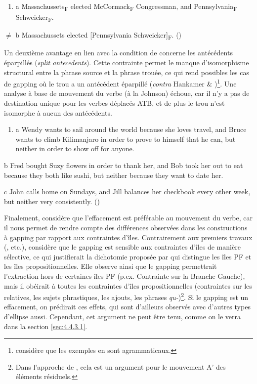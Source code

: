 \begin{enumerate}
\item \label{bkm:Ref288561460}a   Massachussets\textsubscript{F} elected McCormack\textsubscript{F} Congressman, and Pennsylvania\textsubscript{F} Schweicker\textsubscript{F}.  


\end{enumerate}
${\neq}$  b  Massachussets elected [Pennsylvania Schweicker]\textsubscript{F}.       (\citet{Hankamer1973})

Un deuxième avantage en lien avec la condition de \citet{Merchant2001} concerne les antécédents éparpillés (\textit{split antecedents}). Cette contrainte permet le manque d'isomorphisme structural entre la phrase source et la phrase trouée, ce qui rend possibles les cas de gapping où le trou a un antécédent éparpillé (\textit{contra} Hankamer \& \citet{Sag1976})\footnote{\citet[304]{Johnson2009} considère que les exemples en  sont agrammaticaux.}. Une analyse à base de mouvement du verbe (à la Johnson) échoue, car il n'y a pas de destination unique pour les verbes déplacés ATB, et de plus le trou n'est isomorphe à aucun des antécédents.


\begin{enumerate}
\item \label{bkm:Ref288640715}a   Wendy wants to sail around the world because she loves travel, and Bruce wants to climb Kilimanjaro in order to prove to himself that he can, but neither in order to show off for anyone.  


\end{enumerate}
  b  Fred bought Suzy flowers in order to thank her, and Bob took her out to eat because they both like sushi, but neither because they want to date her.

  c  John calls home on Sundays, and Jill balances her checkbook every other week, but neither very consistently.              (\citet{Coppock2001})

Finalement, \citet{Coppock2001} considère que l'effacement est préférable au mouvement du verbe, car il nous permet de rendre compte des différences observées dans les constructions à gapping par rapport aux contraintes d'îles. Contrairement aux premiers travaux (\citet{Neijt1979}, etc.), \citet{Coppock2001} considère que le gapping est sensible aux contraintes d'îles de manière sélective, ce qui justifierait la dichotomie proposée par \citet{Merchant2001} qui distingue les îles PF et les îles propositionnelles. Elle observe ainsi que le gapping permettrait l'extraction hors de certaines îles PF (p.ex. Contrainte sur la Branche Gauche), mais il obéirait à toutes les contraintes d'îles propositionnelles (contraintes sur les relatives, les sujets phrastiques, les ajouts, les phrases \textit{qu-})\footnote{Dans l'approche de \citet{Coppock2001}, cela est un argument pour le mouvement A' des éléments résiduels.}. Si le gapping est un effacement, on prédirait ces effets, qui sont d'ailleurs observés avec d'autres types d'ellipse aussi. Cependant, cet argument ne peut être tenu, comme on le verra dans la section \ref{sec:4.4.3.1}.


